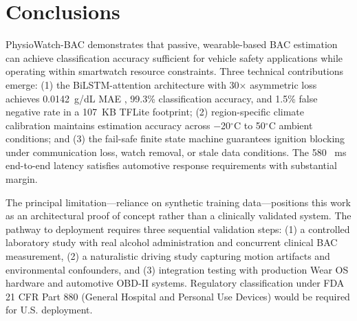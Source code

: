 \documentclass[HARVARD,Times2COL]{WileyNJDv5} %
\providecommand{\DIFadd}[1]{{\protect\color{red} #1}} %
\providecommand{\DIFdel}[1]{} %
\providecommand{\DIFaddbegin}{} %
\providecommand{\DIFaddend}{} %
\providecommand{\DIFdelbegin}{} %
\providecommand{\DIFdelend}{} %
\providecommand{\DIFscaledelfig}{0.5}
\newlength{\DIFdelgraphicswidth} %
\newlength{\DIFdelgraphicsheight} %
\providecommand{\DIFaddincludegraphics}[2][]{{\color{blue}\fbox{\DIFOincludegraphics[#1]{#2}}}} %
\providecommand{\DIFdelincludegraphics}[2][]{%
\sbox{\DIFdelgraphicsbox}{\DIFOincludegraphics[#1]{#2}}%
\settoboxwidth{\DIFdelgraphicswidth}{\DIFdelgraphicsbox} %
\settoboxtotalheight{\DIFdelgraphicsheight}{\DIFdelgraphicsbox} %
\scalebox{\DIFscaledelfig}{%
\parbox[b]{\DIFdelgraphicswidth}{\usebox{\DIFdelgraphicsbox}\\[-\baselineskip] \rule{\DIFdelgraphicswidth}{0em}}\llap{\resizebox{\DIFdelgraphicswidth}{\DIFdelgraphicsheight}{%
\setlength{\unitlength}{\DIFdelgraphicswidth}%
\begin{picture}(1,1)%
\thicklines\linethickness{2pt} %
{\color[rgb]{1,0,0}\put(0,0){\framebox(1,1){}}}%
{\color[rgb]{1,0,0}\put(0,0){\line( 1,1){1}}}%
{\color[rgb]{1,0,0}\put(0,1){\line(1,-1){1}}}%
\end{picture}%
}\hspace*{3pt}}} %
} %
\DeclareRobustCommand{\DIFaddbegin}{\DIFOaddbegin \let\includegraphics\DIFaddincludegraphics} %
\DeclareRobustCommand{\DIFaddend}{\DIFOaddend \let\includegraphics\DIFOincludegraphics} %
\DeclareRobustCommand{\DIFdelbegin}{\DIFOdelbegin \let\includegraphics\DIFdelincludegraphics} %
\DeclareRobustCommand{\DIFdelend}{\DIFOaddend \let\includegraphics\DIFOincludegraphics} %
\begin{document}
\DIFaddend \section{Conclusions}\label{sec5}
PhysioWatch-BAC demonstrates that passive, wearable-based BAC estimation can achieve \DIFaddbegin \DIFadd{classification }\DIFaddend accuracy sufficient for vehicle safety applications while \DIFdelbegin \DIFdel{fitting }\DIFdelend \DIFaddbegin \DIFadd{operating }\DIFaddend within smartwatch resource constraints. Three technical contributions emerge: (1) the BiLSTM-attention architecture with \DIFaddbegin \DIFadd{30$\times$ }\DIFaddend asymmetric loss achieves \DIFdelbegin \DIFdel{0.0082 }\DIFdelend \DIFaddbegin \DIFadd{0.0142~}\DIFaddend g/dL MAE\DIFdelbegin \DIFdel{and sub-1}\DIFdelend \DIFaddbegin \DIFadd{, 99.3\% classification accuracy, and 1.5}\DIFaddend \% false negative rate in a \DIFdelbegin \DIFdel{22 }\DIFdelend \DIFaddbegin \DIFadd{107~}\DIFaddend KB TFLite footprint; (2) region-specific climate calibration maintains \DIFdelbegin \DIFdel{accuracy across -20}\DIFdelend \DIFaddbegin \DIFadd{estimation accuracy across $-$20}\DIFaddend $^\circ$C to 50$^\circ$C ambient conditions\DIFdelbegin \DIFdel{where uncalibrated models exhibit 60\% error}\DIFdelend ; and (3) the fail-safe \DIFdelbegin \DIFdel{FSM }\DIFdelend \DIFaddbegin \DIFadd{finite state machine }\DIFaddend guarantees ignition blocking under communication loss, watch removal, or stale data conditions. The 580\DIFaddbegin \DIFadd{~}\DIFaddend ms end-to-end latency satisfies automotive response requirements with \DIFdelbegin \DIFdel{margin. Limitations include reliance }\DIFdelend \DIFaddbegin \DIFadd{substantial margin.
}

\DIFadd{The principal limitation---reliance }\DIFaddend on synthetic training \DIFdelbegin \DIFdel{data and HRV-derived EDA estimates on devices lacking galvanic skin response sensors. }\DIFdelend \DIFaddbegin \DIFadd{data---positions this work as an architectural proof of concept rather than a clinically validated system. The pathway to deployment requires three sequential validation steps: (1) a controlled laboratory study with real alcohol administration and concurrent clinical BAC measurement, (2) a naturalistic driving study capturing motion artifacts and environmental confounders, and (3) integration testing with production Wear OS hardware and automotive OBD-II systems. Regulatory classification under FDA 21 CFR Part 880 (General Hospital and Personal Use Devices) would be required for U.S. deployment.
}
\end{document}

